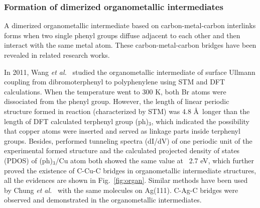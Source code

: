 \documentclass[%
 reprint,
 amsmath,amssymb,
 aps,
prb,
]{revtex4-2}
\begin{document}

\subsubsection{Formation of dimerized organometallic intermediates}

A dimerized organometallic intermediate based on carbon-metal-carbon interlinks forms when two single phenyl groups diffuse adjacent to each other and then interact with the same metal atom. These carbon-metal-carbon bridges have been revealed in related research works. 

In 2011, Wang \textit{et al.}~\cite{jacs2011} studied the organometallic intermediate of surface Ullmann coupling from dibromoterphenyl to polyphenylene using STM and DFT calculations. When the temperature went to 300 K, both Br atoms were dissociated from the phenyl group. However, the length of linear periodic structure formed in reaction (characterized by STM) was 4.8 \AA\ longer than the length of DFT calculated terphenyl group (ph)$_{3}$, which indicated the possibility that copper atoms were inserted and served as linkage parts inside terphenyl groups. Besides, performed tunneling spectra (dI/dV) of one periodic unit of the experimental formed structure and the calculated projected density of states (PDOS) of (ph)$_{3}$/Cu atom both showed the same value at ~2.7 eV, which further proved the existence of C-Cu-C bridges in organometallic intermediate structures, all the evidences are shown in Fig.~\ref{fig:organ}. Similar methods have been used by Chung \textit{et al.}~\cite{PCCP2012} with the same molecules on Ag(111). C-Ag-C bridges were observed and demonstrated in the organometallic intermediates.
\end{document}

